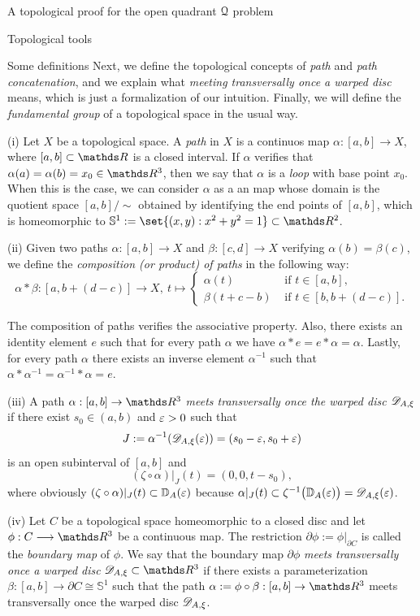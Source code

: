 \documentclass[11pt, a4paper, english, twoside, notitlepage, openright]{report}
\begin{document}
\begin{chapter}{A topological proof for the open quadrant $\mathcal{Q}$ problem}
\begin{section}{Topological tools}
\begin{subsection}{Some definitions}
Next, we define the topological concepts of \emph{path} and \emph{path concatenation}, and we explain what \emph{meeting transversally once a warped disc} means, which is just a formalization of our intuition. Finally, we will define the \emph{fundamental group} of a topological space in the usual way.
\begin{definitions}
(i) Let $X$ be a topological space. A \emph{path} in $X$ is a continuos map $\alpha:[a, b] \to X$, where $[a,b] \subset \R$ is a closed interval. If $\alpha$ verifies that $\alpha(a) = \alpha(b) = x_0 \in \R^3$, then we say that $\alpha$ is a \emph{loop} with base point $x_0$. When this is the case, we can consider $\alpha$ as a an map whose domain is the quotient space $[a,b]/\! \sim$ obtained by identifying the end points of $[a,b]$, which is homeomorphic to $\mathbb{S}^1 := \set{(x,y): x^2+y^2=1} \subset \R^2$.

(ii) Given two paths $\alpha:[a, b] \to X$ and $\beta:[c, d] \to X$ verifying $\alpha(b) = \beta(c)$, we define the \emph{composition (or product) of paths} in the following way:
$$
\alpha * \beta: [a, b+(d-c)] \longrightarrow X,\ t \longmapsto
\left\{
\begin{array}{ll}
\alpha(t) &\text{ if } t\in[a,b],\\
\beta(t+c-b) &\text{ if } t\in[b, b+(d-c)].
\end{array}
\right.
$$

The composition of paths verifies the associative property. Also, there exists an identity element $e$ such that for every path $\alpha$ we have $\alpha *e = e*\alpha=\alpha$. Lastly, for every path $\alpha$ there exists an inverse element $\alpha^{-1}$ such that $\alpha*\alpha^{-1} = \alpha^{-1}*\alpha =e$.

(iii) A path $\alpha:[a,b]\rightarrow\R^3$ \emph{meets transversally once the warped disc $\mathscr{D}_{A,\xi}$} if there exist $s_0\in(a,b)$ and $\varepsilon>0$ such that
$$
J:=\alpha^{-1}(\mathscr{D}_{A,\xi}(\varepsilon))=(s_0-\varepsilon,s_0+\varepsilon)
$$
is an open subinterval of $[a,b]$ and 
$$
(\zeta\circ\alpha)|_J(t)=(0,0,t-s_0),
$$
where obviously $(\zeta\circ\alpha)|_J(t) \subset \mathbb{D}_A(\varepsilon)$ because $\alpha|_J(t) \subset \zeta^{-1}\big(\mathbb{D}_A(\varepsilon)\big) = \mathscr{D}_{A,\xi}(\varepsilon)$.

(iv) Let $C$ be a topological space homeomorphic to a closed disc and let $\phi:C\longrightarrow\R^3$ be a continuous map. The restriction $\partial\phi:=\phi|_{\partial C}$ is called the \textit{boundary map} of $\phi$. We say that the boundary map $\partial\phi$ \emph{meets transversally once a warped disc} $\D_{A,\xi}\subset\R^3$ if there exists a parameterization $\beta:[a,b]\to\partial C \cong \mathbb{S}^1$ such that the path $\alpha:=\phi\circ\beta: [a,b] \to \R^3$ meets transversally once the warped disc $\mathscr{D}_{A,\xi}$.


\end{definitions}
\end{subsection}
\end{section}
\end{chapter}
\end{document}
